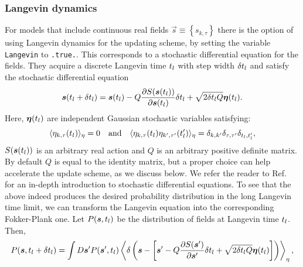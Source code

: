 

\subsubsection{Langevin dynamics} \label{sec:langevin}

For models that include continuous real fields $\vec{s} \equiv \left\{s_{k,\tau} \right\}$ there is the option of using Langevin dynamics for the updating scheme, by setting  the variable \texttt{Langevin} to \texttt{.true.}. This corresponds to a  stochastic differential equation for the fields. They acquire a discrete Langevin time $t_{l}$ with step width $\delta t_{l}$ and satisfy the stochastic differential equation
\begin{equation}\label{eqn:langevin}
   \boldsymbol{s}(t_{l} +  \delta t_{l})    =    \boldsymbol{s}(t_{l})    - Q \frac{\partial S( \boldsymbol{s}(t_{l})) }{\partial    \boldsymbol{s}(t_{l}) }    \delta t_{l}     +\sqrt{2 \delta t_{l} Q} \boldsymbol{\eta}(t_{l}).
\end{equation}
Here, $ \boldsymbol{\eta}(t_{l}) $ are independent Gaussian stochastic variables satisfying:
\begin{equation}
        \langle  \eta_{k,\tau}(t_{l}) \rangle_{\eta}  = 0   \quad\text{and}\quad    \langle  \eta_{k,\tau}(t_{l})  \eta_{k',\tau'}(t_{l}') \rangle_{\eta}  = \delta_{k,k'} \delta_{\tau,\tau'} \delta_{t_{l},t_{l}'},
\end{equation}
$S( \boldsymbol{s}(t_{l}))$ is an arbitrary real action and $Q$ is an arbitrary positive definite matrix. By default $Q$ is equal to the identity matrix, but a proper choice can help accelerate the update scheme, as we discuss below. 
We refer the reader to  Ref.~\cite{Gardiner}  for an in-depth introduction to stochastic differential equations.
To see that the above  indeed produces the desired probability distribution in the long Langevin time limit, we can transform the Langevin equation into the corresponding Fokker-Plank one.  Let
$P(\boldsymbol{s}, t_{l}) $ be the distribution of fields at Langevin time $t_{l}$. Then,
\begin{equation}
        P(\boldsymbol{s}, t_{l}  + \delta t_{l} )    = \int D\boldsymbol{s}'  P  (\boldsymbol{s}', t_{l}  )    \left\langle    \delta \left(  \boldsymbol{s} - \left[ \boldsymbol{s}'   - Q\frac{\partial S(\boldsymbol{s}' )}{\partial    \boldsymbol{s}' }   \delta t_{l}     +\sqrt{2 \delta t_{l} Q} \boldsymbol{\eta}(t_{l})  \right]    \right) \right\rangle_{\eta},
\end{equation}
